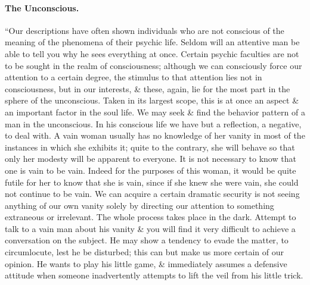 \documentclass{article}
\begin{document}
\paragraph{The Unconscious.} ``Our descriptions have often shown individuals who are not conscious of the meaning of the phenomena of their psychic life. Seldom will an attentive man be able to tell you why he sees everything at once. Certain psychic faculties are not to be sought in the realm of consciousness; although we can consciously force our attention to a certain degree, the stimulus to that attention lies not in consciousness, but in our interests, \& these, again, lie for the most part in the sphere of the unconscious. Taken in its largest scope, this is at once an aspect \& an important factor in the soul life. We may seek \& find the behavior pattern of a man in the unconscious. In his conscious life we have but a reflection, a negative, to deal with. A vain woman usually has no knowledge of her vanity in most of the instances in which she exhibits it; quite to the contrary, she will behave so that only her modesty will be apparent to everyone. It is not necessary to know that one is vain to be vain. Indeed for the purposes of this woman, it would be quite futile for her to know that she is vain, since if she knew she were vain, she could not continue to be vain. We can acquire a certain dramatic security is not seeing anything of our own vanity solely by directing our attention to something extraneous or irrelevant. The whole process takes place in the dark. Attempt to talk to a vain man about his vanity \& you will find it very difficult to achieve a conversation on the subject. He may show a tendency to evade the matter, to circumlocute, lest he be disturbed; this can but make us more certain of our opinion. He wants to play his little game, \& immediately assumes a defensive attitude when someone inadvertently attempts to lift the veil from his little trick.
\end{document}
